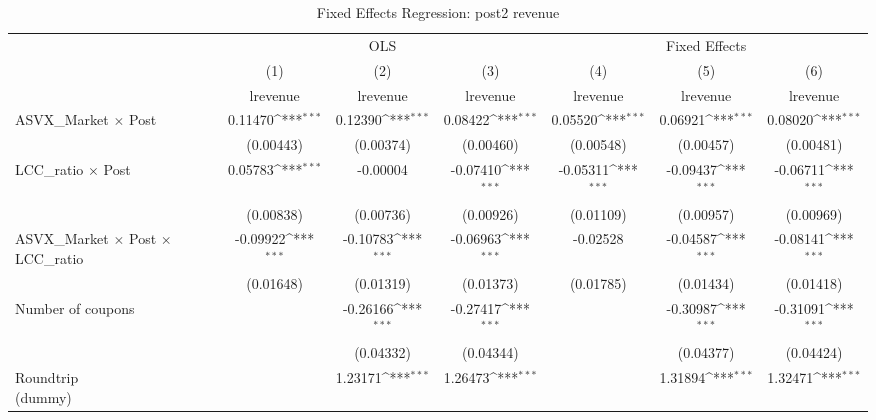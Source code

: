\begin{table}[htbp]\centering
\def\sym#1{\ifmmode^{#1}\else\(^{#1}\)\fi}
\caption{Fixed Effects Regression: post2 revenue}
\begin{tabular}{l*{6}{c}}
\toprule
                    &\multicolumn{3}{c}{OLS}                                          &\multicolumn{3}{c}{Fixed Effects}                                \\\cmidrule(lr){2-4}\cmidrule(lr){5-7}
                    &\multicolumn{1}{c}{(1)}&\multicolumn{1}{c}{(2)}&\multicolumn{1}{c}{(3)}&\multicolumn{1}{c}{(4)}&\multicolumn{1}{c}{(5)}&\multicolumn{1}{c}{(6)}\\
                    &\multicolumn{1}{c}{lrevenue}&\multicolumn{1}{c}{lrevenue}&\multicolumn{1}{c}{lrevenue}&\multicolumn{1}{c}{lrevenue}&\multicolumn{1}{c}{lrevenue}&\multicolumn{1}{c}{lrevenue}\\
\midrule
ASVX\_Market $\times$ Post&     0.11470\sym{***}&     0.12390\sym{***}&     0.08422\sym{***}&     0.05520\sym{***}&     0.06921\sym{***}&     0.08020\sym{***}\\
                    &   (0.00443)         &   (0.00374)         &   (0.00460)         &   (0.00548)         &   (0.00457)         &   (0.00481)         \\
\addlinespace
LCC\_ratio $\times$ Post&     0.05783\sym{***}&    -0.00004         &    -0.07410\sym{***}&    -0.05311\sym{***}&    -0.09437\sym{***}&    -0.06711\sym{***}\\
                    &   (0.00838)         &   (0.00736)         &   (0.00926)         &   (0.01109)         &   (0.00957)         &   (0.00969)         \\
\addlinespace
ASVX\_Market $\times$ Post $\times$ LCC\_ratio&    -0.09922\sym{***}&    -0.10783\sym{***}&    -0.06963\sym{***}&    -0.02528         &    -0.04587\sym{***}&    -0.08141\sym{***}\\
                    &   (0.01648)         &   (0.01319)         &   (0.01373)         &   (0.01785)         &   (0.01434)         &   (0.01418)         \\
\addlinespace
Number of coupons   &                     &    -0.26166\sym{***}&    -0.27417\sym{***}&                     &    -0.30987\sym{***}&    -0.31091\sym{***}\\
                    &                     &   (0.04332)         &   (0.04344)         &                     &   (0.04377)         &   (0.04424)         \\
\addlinespace
\shortstack{Roundtrip \\ (dummy)}&                     &     1.23171\sym{***}&     1.26473\sym{***}&                     &     1.31894\sym{***}&     1.32471\sym{***}\\

\end{tabular}
\end{table}
